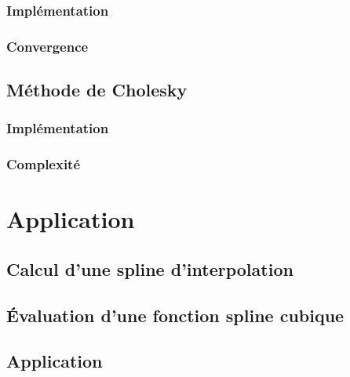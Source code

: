\documentclass[a4paper,11pt]{article}
\begin{document}
\subsubsection{Implémentation}
\subsubsection{Convergence}


\subsection{Méthode de Cholesky}
\subsubsection{Implémentation}
\subsubsection{Complexité}

\section{Application}
\subsection{Calcul d'une spline d'interpolation}
\subsection{Évaluation d'une fonction spline cubique}
\subsection{Application}
\end{document}
